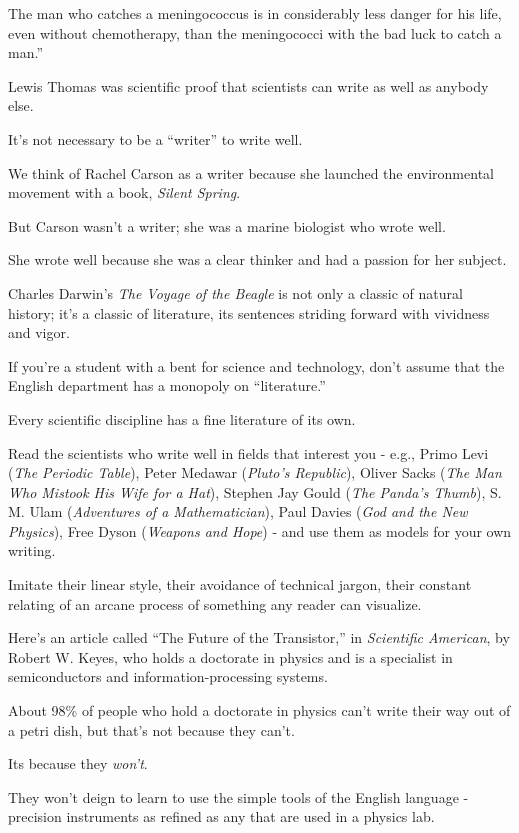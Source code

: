 \documentclass{book}
\numberwithin{equation}{section}
\begin{document}
The man who catches a meningococcus is in considerably less danger for his life, even without chemotherapy, than the meningococci with the bad luck to catch a man.''

%
Lewis Thomas was scientific proof that scientists can write as well as anybody else.

It's not necessary to be a ``writer'' to write well.

We think of Rachel Carson as a writer because she launched the environmental movement with a book, \textit{Silent Spring}.

But Carson wasn't a writer; she was a marine biologist who wrote well.

She wrote well because she was a clear thinker and had a passion for her subject.

Charles Darwin's \textit{The Voyage of the Beagle} is not only a classic of natural history; it's a classic of literature, its sentences striding forward with vividness and vigor.

If you're a student with a bent for science and technology, don't assume that the English department has a monopoly on ``literature.''

Every scientific discipline has a fine literature of its own.

Read the scientists who write well in fields that interest you - e.g., Primo Levi (\textit{The Periodic Table}), Peter Medawar (\textit{Pluto's Republic}), Oliver Sacks (\textit{The Man Who Mistook His Wife for a Hat}), Stephen Jay Gould (\textit{The Panda's Thumb}), S. M. Ulam (\textit{Adventures of a Mathematician}), Paul Davies (\textit{God and the New Physics}), Free Dyson (\textit{Weapons and Hope}) - and use them as models for your own writing.

Imitate their linear style, their avoidance of technical jargon, their constant relating of an arcane process of something any reader can visualize.

%
Here's an article called ``The Future of the Transistor,'' in \textit{Scientific American}, by Robert W. Keyes, who holds a doctorate in physics and is a specialist in semiconductors and information-processing systems.

About 98\% of people who hold a doctorate in physics can't write their way out of a petri dish, but that's not because they can't.

Its because they \textit{won't}.

They won't deign to learn to use the simple tools of the English language - precision instruments as refined as any that are used in a physics lab.
\end{document}
